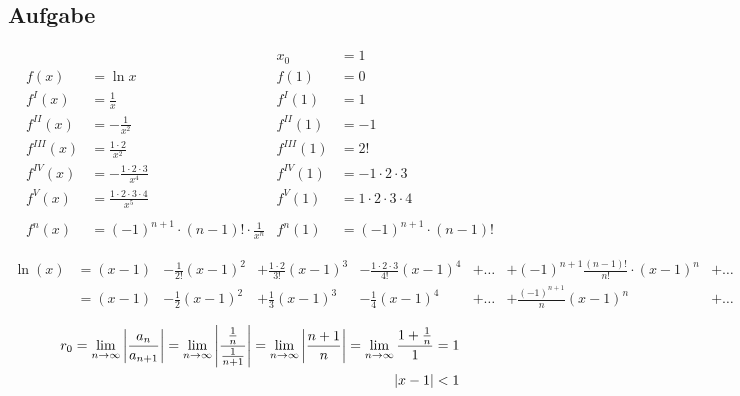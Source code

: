 \subsection{Aufgabe}

\begin{align*}
    & & x_0 &= 1 \\
    f(x) &= \ln x & f(1) &= 0 \\
    f^{I}(x) &= \frac{1}{x} & f^{I}(1) &= 1 \\
    f^{II}(x) &= -\frac{1}{x^2} & f^{II}(1) &= -1 \\
    f^{III}(x) &= \frac{1 \cdot 2}{x^2} & f^{III}(1) &= 2! \\
    f^{IV}(x) &= -\frac{1 \cdot 2 \cdot 3}{x^4} & f^{IV}(1) &= -1 \cdot 2 \cdot 3 \\
    f^{V}(x) &= \frac{1 \cdot 2 \cdot 3 \cdot 4}{x^5} & f^{V}(1) &= 1 \cdot 2 \cdot 3 \cdot 4 \\
    \\
    f^n(x) &= (-1)^{n+1} \cdot (n-1)! \cdot \frac{1}{x^n} & f^n(1) &= (-1)^{n+1} \cdot (n-1)!
\end{align*}

\begin{align*}
    \ln(x)
    &= (x - 1) &- \frac{1}{2!} (x - 1)^2 &+ \frac{1 \cdot 2}{3!} (x - 1)^3 &- \frac{1 \cdot 2 \cdot 3}{4!} (x - 1)^4 &+ \ldots &+ (-1)^{n+1} \frac{(n-1)!}{n!} \cdot (x - 1)^n &+ \ldots \\
    &= (x - 1) &- \frac{1}{2} (x - 1)^2 &+ \frac{1}{3} (x - 1)^3 &- \frac{1}{4} (x - 1)^4 &+ \ldots &+ \frac{(-1)^{n+1}}{n} (x - 1)^n &+ \ldots
\end{align*}

\begin{align*}
    r_0 = \lim_{n \rightarrow \infty} \left| \frac{a_n}{a_{n+1}} \right|
        = \lim_{n \rightarrow \infty} \left| \frac{\frac{1}{n}}{\frac{1}{n+1}} \right|
        = \lim_{n \rightarrow \infty} \left| \frac{n+1}{n} \right|
        = \lim_{n \rightarrow \infty} \frac{1 + \frac{1}{n}}{1}
        = 1 \\
    \left| x - 1 \right| < 1
\end{align*}


\begin{figure}[H]
    \centering
\end{figure}


